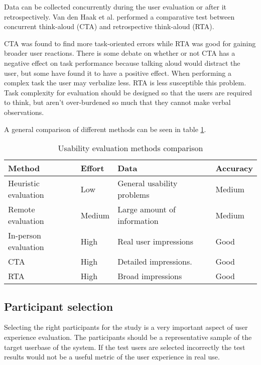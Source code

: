Data can be collected concurrently during the user evaluation or after it retrospectively. Van den Haak et al. \cite{van2003retrospective} performed a comparative test between concurrent think-aloud (CTA) and retrospective think-aloud (RTA).

CTA was found to find more task-oriented errors while RTA was good for gaining broader user reactions. There is some debate on whether or not CTA has a negative effect on task performance because talking aloud would distract the user, but some have found it to have a positive effect. When performing a complex task the user may verbalize less. RTA is less susceptible this problem. Task complexity for evaluation should be designed so that the users are required to think, but aren't over-burdened so much that they cannot make verbal observations.

A general comparison of different methods can be seen in table \ref{methods_comparison}.

\begin{table}[!ht]
\def\arraystretch{1.1}%
    \begin{center}
    \caption{Usability evaluation methods comparison}
    \label{methods_comparison}
    \begin{tabular}{| l | l | l |  l | }
    \hline
    Method & Effort &  Data &  Accuracy  \\
    \hline
    Heuristic evaluation   & Low & General usability problems &  Medium     \\
    Remote evaluation & Medium &  Large amount of information &  Medium     \\
    In-person evaluation  & High & Real user impressions &  Good    \\
    CTA  & High &  Detailed impressions. &  Good   \\
    RTA  & High & Broad impressions & Good   \\
    \hline
    \end{tabular}
    \end{center}
\end{table}

\subsection{Participant selection}
Selecting the right participants for the study is a very important aspect of user experience evaluation. The participants should be a representative sample of the target userbase of the system. If the test users are selected incorrectly the test results would not be a useful metric of the user experience in real use. \cite{rubin2008handbook, albert2013measuring}

